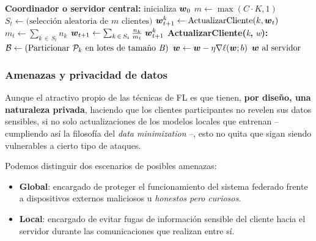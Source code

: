 \documentclass[00-Trabajo_Final.tex]{subfiles}
\begin{document}
\begin{algorithm}[H]
\caption{\textit{FederatedAveraging}. Los $K$ clientes se indexan por $k$, $B$ es el tamaño de lote local, $E$ el número de iteraciones (\textit{epochs}) locales y $\eta$ la tasa de aprendizaje.}
\label{alg:fedavg}
\begin{algorithmic}[1]
\STATE \textbf{Coordinador o servidor central:}
\STATE inicializa $\boldsymbol{w}_0$
\STATE $m \leftarrow \max (C \cdot K, 1)$
\STATE $S_t \leftarrow \text{(selección aleatoria de } m \text{ clientes)}$
\STATE $\boldsymbol{w}_{t+1}^k \leftarrow \text{ActualizarCliente(}k, \boldsymbol{w}_t \text{)}$
\ENDFOR
\STATE $m_t \leftarrow \sum_{k\,\in\,S_t} n_k$
\STATE $\boldsymbol{w}_{t+1} \leftarrow \sum_{k\,\in\,S_t} \frac{n_k}{m_t}\;\boldsymbol{w}_{t+1}^k$
\ENDFOR
\STATE
\STATE \textbf{ActualizarCliente(}\textit{k}\textbf{, }\textit{w}\textbf{):}
\STATE $\mathcal{B} \leftarrow \text{(Particionar } \mathcal{P}_k \text{ en lotes de tamaño \emph{B})}$
\STATE $\boldsymbol{w} \leftarrow \boldsymbol{w} - \eta \nabla \ell (\boldsymbol{w}; b)$
\ENDFOR
\ENDFOR
\RETURN $\boldsymbol{w} \text{ al servidor}$
\end{algorithmic}
\end{algorithm}

\subsubsection{Amenazas y privacidad de datos}
Aunque el atractivo propio de las técnicas de FL es que tienen, \textbf{por diseño, una naturaleza privada}, haciendo que los clientes participantes no revelen sus datos sensibles, si no solo actualizaciones de los modelos locales que entrenan{ }--{ }cumpliendo así la filosofía del \textit{data minimization}{ }--{}, esto no quita que sigan siendo vulnerables a cierto tipo de ataques.

\vspace{0.5em}

Podemos distinguir dos escenarios de posibles amenazas:

\begin{itemize}[noitemsep]
    \item \textbf{Global}: encargado de proteger el funcionamiento del sistema federado frente a dispositivos externos maliciosos u \textit{honestos pero curiosos}.
    \item \textbf{Local}: encargado de evitar fugas de información sensible del cliente hacia el servidor durante las comunicaciones que realizan entre sí.
\end{itemize}
\end{document}
